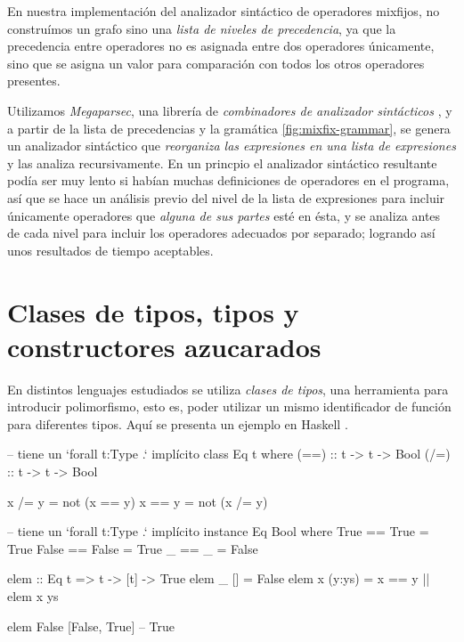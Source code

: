 {\begin{implementationfr}
En nuestra implementación del analizador sintáctico de operadores mixfijos, no construímos un grafo sino una \emph{lista de niveles de precedencia}, ya que la precedencia entre operadores no es asignada entre dos operadores únicamente, sino que se asigna un valor para comparación con todos los otros operadores presentes.

Utilizamos \emph{Megaparsec}, una librería de \emph{combinadores de analizador sintácticos} \cite{megaparsec}, y a partir de la lista de precedencias y la gramática \ref{fig:mixfix-grammar}, se genera un analizador sintáctico que \emph{reorganiza las expresiones en una lista de expresiones} y las analiza recursivamente. En un princpio el analizador sintáctico resultante podía ser muy lento si habían muchas definiciones de operadores en el programa, así que se hace un análisis previo del nivel de la lista de expresiones para incluir únicamente operadores que \emph{alguna de sus partes} esté en ésta, y se analiza antes de cada nivel para incluir los operadores adecuados por separado; logrando así unos resultados de tiempo aceptables.
\end{implementationfr}

\section{Clases de tipos, tipos y constructores azucarados}

\begin{designfr}
En distintos lenguajes estudiados se utiliza \emph{clases de tipos}, una herramienta para introducir polimorfismo, esto es, poder utilizar un mismo identificador de función para diferentes tipos. Aquí se presenta un ejemplo en Haskell \cite{haskell}.

\begin{haskellcode}
-- tiene un `forall t:Type .` implícito
class Eq t where
    (==) :: t -> t -> Bool
    (/=) :: t -> t -> Bool

    x /= y = not (x == y)
    x == y = not (x /= y)

-- tiene un `forall t:Type .` implícito
instance Eq Bool where
    True == True = True
    False == False = True
    _ == _ = False

elem :: Eq t => t -> [t] -> True
elem _ [] = False
elem x (y:ys) = x == y || elem x ys

elem False [False, True]    -- True
\end{haskellcode}


\end{designfr}}
